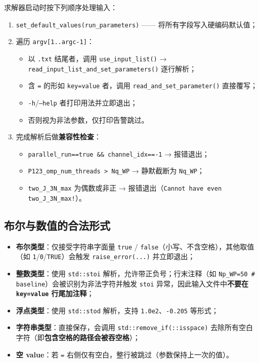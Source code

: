求解器启动时按下列顺序处理输入：
\begin{enumerate}
  \item \texttt{set\_default\_values(run\_parameters)} —— 将所有字段写入硬编码默认值；
  \item 遍历 \texttt{argv[1..argc-1]}：
    \begin{itemize}
      \item 以 \texttt{.txt} 结尾者，调用 \texttt{use\_input\_list()} → \texttt{read\_input\_list\_and\_set\_parameters()} 逐行解析；
      \item 含 \texttt{=} 的形如 \texttt{key=value} 者，调用 \texttt{read\_and\_set\_parameter()} 直接覆写；
      \item \texttt{-h}/\texttt{--help} 者打印用法并立即退出；
      \item 否则视为非法参数，仅打印告警跳过。
    \end{itemize}
  \item 完成解析后做\textbf{兼容性检查}：
    \begin{itemize}
      \item \texttt{parallel\_run==true \&\& channel\_idx==-1} → 报错退出；
      \item \texttt{P123\_omp\_num\_threads > Nq\_WP} → 静默截断为 \texttt{Nq\_WP}；
      \item \texttt{two\_J\_3N\_max} 为偶数或非正 → 报错退出（\texttt{Cannot have even two\_J\_3N\_max!}）。
    \end{itemize}
\end{enumerate}

\subsection{布尔与数值的合法形式}

\begin{itemize}
  \item \textbf{布尔类型}：仅接受字符串字面量 \texttt{true} / \texttt{false}（小写、不含空格），其他取值（如 \texttt{1}/\texttt{0}/\texttt{TRUE}）会触发
        \texttt{raise\_error(...)} 并立即退出；
  \item \textbf{整数类型}：使用 \texttt{std::stoi} 解析，允许带正负号；行末注释（如 \texttt{Np\_WP=50 \# baseline}）会被识别为非法字符并触发
        \texttt{stoi} 异常，因此输入文件中\textbf{不要在 \texttt{key=value} 行尾加注释}；
  \item \textbf{浮点类型}：使用 \texttt{std::stod} 解析，支持 \texttt{1.0e2}、\texttt{-0.205} 等形式；
  \item \textbf{字符串类型}：直接保存，会调用 \texttt{std::remove\_if(::isspace)} 去除所有空白字符（即\textbf{包含空格的路径会被吞空格}）；
  \item \textbf{空 value}：若 \texttt{=} 右侧仅有空白，整行被跳过（参数保持上一次的值）。
\end{itemize}

